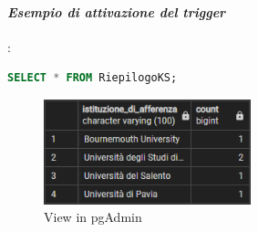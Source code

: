 \documentclass[a4page]{article}
\begin{document}
\paragraph{\textit{Esempio di attivazione del trigger}}:
\begin{lstlisting}[language=SQL,
        deletekeywords={IDENTITY,INT},
        morekeywords={clustered},    
        framesep=10pt,
        framextopmargin=10pt]
SELECT * FROM RiepilogoKS; 
\end{lstlisting}
\vspace{-0.5cm}
\begin{figure}[h!]
\hspace{-0.3cm}
\includegraphics[width=6cm]{VIEW}
\caption{View in pgAdmin}
\end{figure}
\newpage
\end{document}
